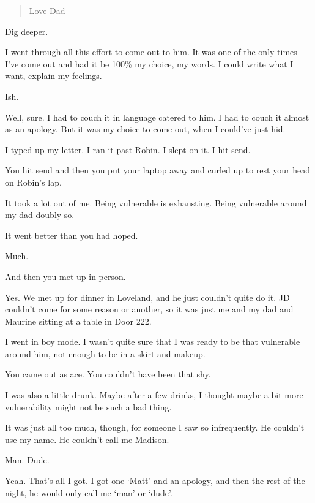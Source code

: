 \begin{paracol}{2}
\begin{leftcolumn}
\begin{quotation}
Love Dad
\end{quotation}

\begin{ally}
Dig deeper.
\end{ally}
\newpage

I went through all this effort to come out to him. It was one of the only times I've come out and had it be 100\% my choice, my words. I could write what I want, explain my feelings.

\begin{ally}
Ish.
\end{ally}
Well, sure. I had to couch it in language catered to him. I had to couch it almost as an apology. But it was my choice to come out, when I could've just hid.

I typed up my letter. I ran it past Robin. I slept on it. I hit send.

\begin{ally}
You hit send and then you put your laptop away and curled up to rest your head on Robin's lap.
\end{ally}
It took a lot out of me. Being vulnerable is exhausting. Being vulnerable around my dad doubly so.

\begin{ally}
It went better than you had hoped.
\end{ally}
Much.

\begin{ally}
And then you met up in person.
\end{ally}
Yes. We met up for dinner in Loveland, and he just couldn't quite do it. JD couldn't come for some reason or another, so it was just me and my dad and Maurine sitting at a table in Door 222.

I went in boy mode. I wasn't quite sure that I was ready to be that vulnerable around him, not enough to be in a skirt and makeup.

\begin{ally}
You came out as ace. You couldn't have been that shy.
\end{ally}
I was also a little drunk. Maybe after a few drinks, I thought maybe a bit more vulnerability might not be such a bad thing.

It was just all too much, though, for someone I saw so infrequently. He couldn't use my name. He couldn't call me Madison.

\begin{ally}
Man. Dude.
\end{ally}
Yeah. That's all I got. I got one `Matt' and an apology, and then the rest of the night, he would only call me `man' or `dude'.


\end{leftcolumn}
\end{paracol}
